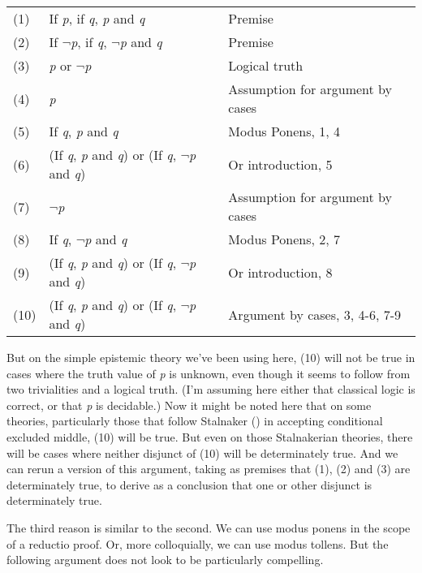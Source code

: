 \documentclass[
  11pt,
  letterpaper,
  DIV=11,
  numbers=noendperiod,
  oneside]{scrartcl}
\begin{document}
\begin{longtable}[]{@{}
  >{\raggedleft\arraybackslash}p{}
  >{\raggedright\arraybackslash}p{}
  >{\raggedright\arraybackslash}p{}@{}}
\toprule\noalign{}
\endhead
\bottomrule\noalign{}
\endlastfoot
(1) & If \emph{p}, if \emph{q}, \emph{p} and \emph{q} & Premise \\
(2) & If \(\neg\)\emph{p}, if \emph{q}, \(\neg\)\emph{p} and \emph{q} &
Premise \\
(3) & \emph{p} or \(\neg\)\emph{p} & Logical truth \\
(4) & \emph{p} & Assumption for argument by cases \\
(5) & If \emph{q}, \emph{p} and \emph{q} & Modus Ponens, 1, 4 \\
(6) & (If \emph{q}, \emph{p} and \emph{q}) or (If \emph{q},
\(\neg\)\emph{p} and \emph{q}) & Or introduction, 5 \\
(7) & \(\neg\)\emph{p} & Assumption for argument by cases \\
(8) & If \emph{q}, \(\neg\)\emph{p} and \emph{q} & Modus Ponens, 2, 7 \\
(9) & (If \emph{q}, \emph{p} and \emph{q}) or (If \emph{q},
\(\neg\)\emph{p} and \emph{q}) & Or introduction, 8 \\
(10) & (If \emph{q}, \emph{p} and \emph{q}) or (If \emph{q},
\(\neg\)\emph{p} and \emph{q}) & Argument by cases, 3, 4-6, 7-9 \\
\end{longtable}

But on the simple epistemic theory we've been using here, (10) will not
be true in cases where the truth value of \emph{p} is unknown, even
though it seems to follow from two trivialities and a logical truth.
(I'm assuming here either that classical logic is correct, or that
\emph{p} is decidable.) Now it might be noted here that on some
theories, particularly those that follow Stalnaker
() in accepting conditional excluded
middle, (10) will be true. But even on those Stalnakerian theories,
there will be cases where neither disjunct of (10) will be determinately
true. And we can rerun a version of this argument, taking as premises
that (1), (2) and (3) are determinately true, to derive as a conclusion
that one or other disjunct is determinately true.

The third reason is similar to the second. We can use modus ponens in
the scope of a reductio proof. Or, more colloquially, we can use modus
tollens. But the following argument does not look to be particularly
compelling.
\end{document}
